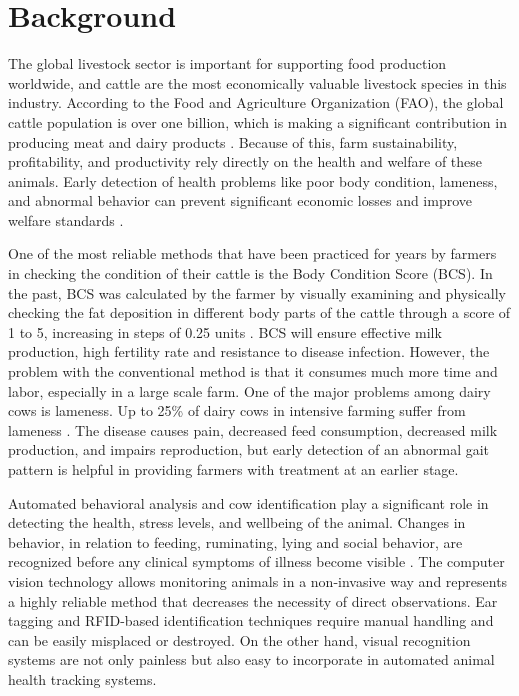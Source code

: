 \section{Background}

The global livestock sector is important for supporting food production worldwide, and cattle are the most economically valuable livestock species in this industry. According to the Food and Agriculture Organization (FAO), the global cattle population is over one billion, which is making a significant contribution in producing meat and dairy products \cite{fao2018livestock}. Because of this, farm sustainability, profitability, and productivity rely directly on the health and welfare of these animals. Early detection of health problems like poor body condition, lameness, and abnormal behavior can prevent significant economic losses and improve welfare standards \cite{weary2009understanding}.

One of the most reliable methods that have been practiced for years by farmers in checking the condition of their cattle is the Body Condition Score (BCS). In the past, BCS was calculated by the farmer by visually examining and physically checking the fat deposition in different body parts of the cattle through a score of 1 to 5, increasing in steps of 0.25 units \cite{edmonson1989bcs}. BCS will ensure effective milk production, high fertility rate and resistance to disease infection. However, the problem with the conventional method is that it consumes much more time and labor, especially in a large scale farm. One of the major problems among dairy cows is lameness. Up to 25\% of dairy cows in intensive farming suffer from lameness \cite{whay2003lameness}. The disease causes pain, decreased feed consumption, decreased milk production, and impairs reproduction, but early detection of an abnormal gait pattern is helpful in providing farmers with treatment at an earlier stage.

Automated behavioral analysis and cow identification play a significant role in detecting the health, stress levels, and wellbeing of the animal. Changes in behavior, in relation to feeding, ruminating, lying and social behavior, are recognized before any clinical symptoms of illness become visible \cite{weary2009understanding}. The computer vision technology allows monitoring animals in a non-invasive way and represents a highly reliable method that decreases the necessity of direct observations. Ear tagging and RFID-based identification techniques require manual handling and can be easily misplaced or destroyed. On the other hand, visual recognition systems are not only painless but also easy to incorporate in automated animal health tracking systems.

